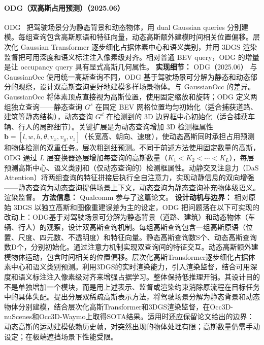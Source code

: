 \paragraph{ODG（双高斯占用预测）（2025.06）}
ODG~\cite{2506_09417} 把驾驶场景分为静态背景和动态物体，用 dual Gaussian queries 分别建模。每组查询包含高斯原语和特征向量，动态高斯额外建模时间相关位置偏移。层次化 Gaussian Transformer 逐步细化占据体素中心和语义类别，并用 3DGS 渲染监督把可用深度和语义标注注入像素级对齐。相对普通 BEV query，ODG 的增量是让 occupancy query 具有显式高斯几何属性。
\textbf{实现细节：} ODG（2025.06） 与 GaussianOcc 使用统一高斯查询不同，ODG 基于驾驶场景可分解为静态和动态部分的观察，设计双高斯查询更好地建模多样场景物体。与 GaussianOcc 的差异。GaussianOcc 将体素顶点直接视为高斯位置，使用固定缩放和旋转；ODG 定义两组独立查询——静态查询 $G^s$ 在固定 BEV 网格位置均匀初始化（适合捕获道路、建筑等静态结构），动态查询 $G^d$ 在检测到的 3D 边界框中心初始化（适合捕获车辆、行人的局部细节）。关键扩展是为动态查询增加 3D 检测框属性 $\mathbf{b} = [l, w, h, \theta, v_x, v_y, v_z]$（长宽高、朝向、速度），使动态高斯同时承担占用预测和物体检测的双重任务。层次粗到细预测。不同于前述方法使用固定数量的高斯，ODG 通过 $L$ 层变换器逐层增加每查询的高斯数量（$K_1 < K_2 < \cdots < K_L$），每层预测高斯中心、语义类别和（仅动态查询的）检测框属性。动静交叉注意力（DaS Attention）将两组查询的特征拼接后执行全自注意力，实现动静信息的双向增强——静态查询为动态查询提供场景上下文，动态查询为静态查询补充物体级语义。渲染监督。
\textbf{方法信息：} Qualcomm 参与了这篇论文。
\textbf{设计动机与边界：} 相对原始 3DGS 以独立高斯和图像重建误差为主的设定，ODG 把问题落在以下可实现的改动上：ODG基于对驾驶场景可分解为静态背景（道路、建筑）和动态物体（车辆、行人）的观察，设计双高斯查询机制。每组高斯查询包含一组高斯原语（位置、尺度、四元数、不透明度）和特征向量。静态高斯查询数S个、动态高斯查询数D个，分别初始化。通过注意力机制实现双查询间的特征交互。动态高斯额外建模物体运动，包含时间相关的位置偏移。层次化高斯Transformer逐步细化占据体素中心和语义类别预测。利用3DGS的实时渲染能力，引入渲染监督，结合可用深度和语义标注注入像素级对齐来增强占据学习。整体保持低推理开销。其设计目的不是单独增加一个模块，而是用上述表示、监督或渲染约束消除原流程在目标任务中的具体失配。提出分层双稀疏高斯表示方法，将驾驶场景分解为静态背景和动态物体分别建模，结合层次化高斯Transformer和3DGS渲染监督，在Occ3D-nuScenes和Occ3D-Waymo上取得SOTA结果。适用时还应保留论文给出的边界：动态高斯的运动建模依赖历史帧，对突然出现的物体处理有限；高斯数量仍需手动设定；在极端遮挡场景下性能受限。
